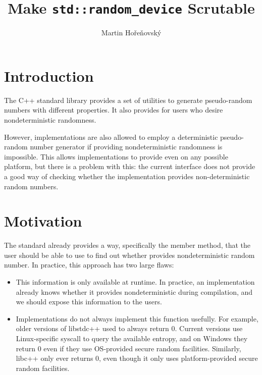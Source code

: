 \documentclass{wg21}
\title{Make \texttt{std::random\_device} Scrutable}
\author{Martin Hořeňovský}{martin.horenovsky@gmail.com}
\begin{document}
\maketitle



\hypertarget{introduction}{%
    \section{Introduction}\label{introduction}}

The C++ standard library provides a set of utilities to generate
pseudo-random numbers with different properties. It also provides
 for users who desire nondeterministic
randomness.

However, implementations are also allowed to employ a deterministic
pseudo-random number generator if providing nondeterministic randomness
is impossible. This allows implementations to provide
 even on any possible platform, but there
is a problem with this: the current interface does not provide a good
way of checking whether the implementation provides non-deterministic
random numbers.


\hypertarget{motivation}{%
    \section{Motivation}\label{motivation}}

The standard already provides a way, specifically the
 member method, that the user should
be able to use to find out whether  provides
nondeterministic random number. In practice, this approach has two large
flaws:

\begin{itemize}
    \item This information is only available at runtime. In practice,
          an implementation already knows whether it provides
          nondeterministic during compilation, and we should expose this
          information to the users.
    \item Implementations do not always implement this function usefully.
          For example, older versions of libstdc++ used to always return 0.
          Current versions use Linux-specific syscall to query the
          available entropy, and on Windows they return 0 even if they use
          OS-provided secure random facilities. Similarly, libc++ only ever
          returns 0, even though it only uses platform-provided secure
          random facilities.
\end{itemize}
\end{document}
